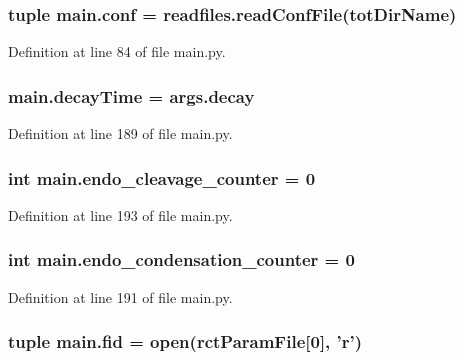 \hypertarget{a00122_adc567db25548116293968a9102beab98}{
\subsubsection[{conf}]{\setlength{\rightskip}{0pt plus 5cm}tuple main.\-conf = readfiles.\-read\-Conf\-File({\bf tot\-Dir\-Name})}}\label{a00122_adc567db25548116293968a9102beab98}


Definition at line 84 of file main.\-py.

\hypertarget{a00122_a5517c07ae046c271d6291e9b3f7d139d}{
\subsubsection[{decay\-Time}]{\setlength{\rightskip}{0pt plus 5cm}main.\-decay\-Time = args.\-decay}}\label{a00122_a5517c07ae046c271d6291e9b3f7d139d}


Definition at line 189 of file main.\-py.

\hypertarget{a00122_a17b22b48a2afe0223186b4275fe5ba70}{
\subsubsection[{endo\-\_\-cleavage\-\_\-counter}]{\setlength{\rightskip}{0pt plus 5cm}int main.\-endo\-\_\-cleavage\-\_\-counter = 0}}\label{a00122_a17b22b48a2afe0223186b4275fe5ba70}


Definition at line 193 of file main.\-py.

\hypertarget{a00122_a0521d81d319c4d79433b5fb65a6da1c2}{
\subsubsection[{endo\-\_\-condensation\-\_\-counter}]{\setlength{\rightskip}{0pt plus 5cm}int main.\-endo\-\_\-condensation\-\_\-counter = 0}}\label{a00122_a0521d81d319c4d79433b5fb65a6da1c2}


Definition at line 191 of file main.\-py.

\hypertarget{a00122_a68ab0ffa4b5ff1cceff01f4abe686ad0}{
\subsubsection[{fid}]{\setlength{\rightskip}{0pt plus 5cm}tuple main.\-fid = open({\bf rct\-Param\-File}\mbox{[}0\mbox{]}, '{\bf r}')}}\label{a00122_a68ab0ffa4b5ff1cceff01f4abe686ad0}


